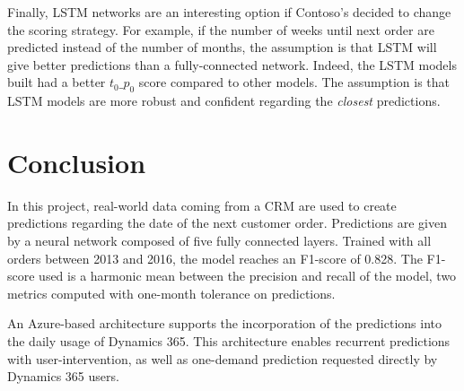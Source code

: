 Finally, LSTM networks are an interesting option if Contoso's decided to change the scoring strategy. For example, if the number of weeks until next order are predicted instead of the number of months, the assumption is that LSTM will give better predictions than a fully-connected network. Indeed, the LSTM models built had a better $t_0\_p_0$ score compared to other models. The assumption is that LSTM models are more robust and confident regarding the \textit{closest} predictions.


\section{Conclusion} \label{sec:use-case-conclusion}
In this project, real-world data coming from a CRM are used to create predictions regarding the date of the next customer order. Predictions are given by a neural network composed of five fully connected layers. Trained with all orders between 2013 and 2016, the model reaches an F1-score of 0.828. The F1-score used is a harmonic mean between the precision and recall of the model, two metrics computed with one-month tolerance on predictions.

An Azure-based architecture supports the incorporation of the predictions into the daily usage of Dynamics 365. This architecture enables recurrent predictions with user-intervention, as well as one-demand prediction requested directly by Dynamics 365 users.